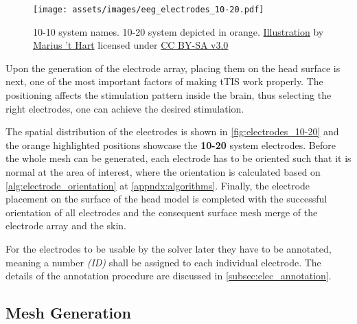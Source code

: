 \begin{wrapfigure}{l}{0.48\textwidth}
    \centering
    \vspace{-15pt}
    \texttt{[image: assets/images/eeg\_electrodes\_10-20.pdf]}
    \caption[10-10 system names. The orange electrodes are used in the 10-20 system.]{10-10 system names. 10-20 system depicted in orange. \href{http://www.mariusthart.net/downloads/eeg_electrodes_10-20.svg}{Illustration} by \href{http://www.beteredingen.nl}{Marius 't Hart} licensed under \href{http://creativecommons.org/licenses/by-sa/3.0/nl/deed.en_GB}{CC BY-SA v3.0}}
    \label{fig:electrodes_10-20}
\end{wrapfigure}

Upon the generation of the electrode array, placing them on the head surface is next, one of the most important factors of making \gls{tTIS} work properly. The positioning affects the stimulation pattern inside the brain, thus selecting the right electrodes, one can achieve the desired stimulation.

The spatial distribution of the electrodes is shown in \autoref{fig:electrodes_10-20} and the orange highlighted positions showcase the \textbf{10-20} system electrodes. Before the whole mesh can be generated, each electrode has to be oriented such that it is normal at the area of interest, where the orientation is calculated based on \autoref{alg:electrode_orientation} at \autoref{appndx:algorithms}. Finally, the electrode placement on the surface of the head model is completed with the successful orientation of all electrodes and the consequent surface mesh merge of the electrode array and the skin.

For the electrodes to be usable by the solver later they have to be annotated, meaning a number \textit{(ID)} shall be assigned to each individual electrode. The details of the annotation procedure are discussed in \ref{subsec:elec_annotation}.

\subsection{Mesh Generation}
\label{subsec:mesh_generation}


